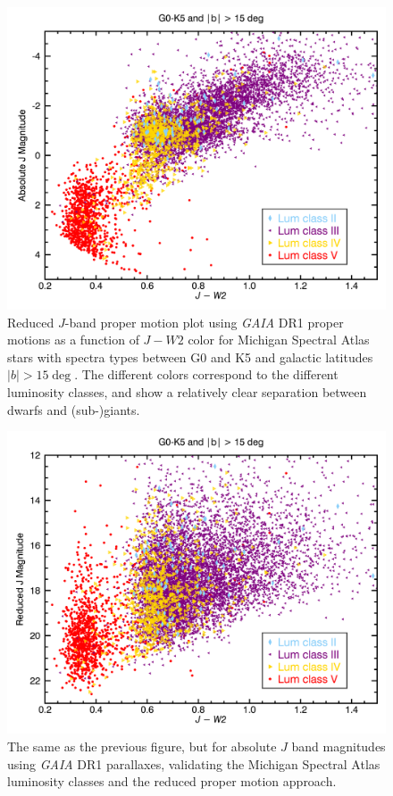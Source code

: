 
\begin{figure}[t] 
  \begin{center}
      \includegraphics[width=1.0\textwidth,clip=true]{Figures/absolute_j/plot-J-W2-G0-K5-b15-abs-J.png}
 \end{center}
 \caption{Reduced $J$-band proper motion plot using \textit{GAIA} DR1 proper motions as a function of $J-W2$ color for Michigan Spectral Atlas stars with spectra types between G0 and K5 and galactic latitudes $|b|>15\deg$.  The different colors correspond to the different luminosity classes, and show a relatively clear separation between dwarfs and (sub-)giants.}\label{fig:absolute_j_jw1}
\end{figure} 

\begin{figure}[t] 
\begin{center}
    \includegraphics[width=1.0\textwidth,clip=true]{Figures/absolute_j/plot-J-W2-G0-K5-b15-rd-J.png}
\end{center}
\caption{The same as the previous figure, but for absolute $J$ band magnitudes using \textit{GAIA} DR1 parallaxes, validating the Michigan Spectral Atlas luminosity classes and the reduced proper motion approach.}\label{fig:reduced_j_jw2}
\end{figure}